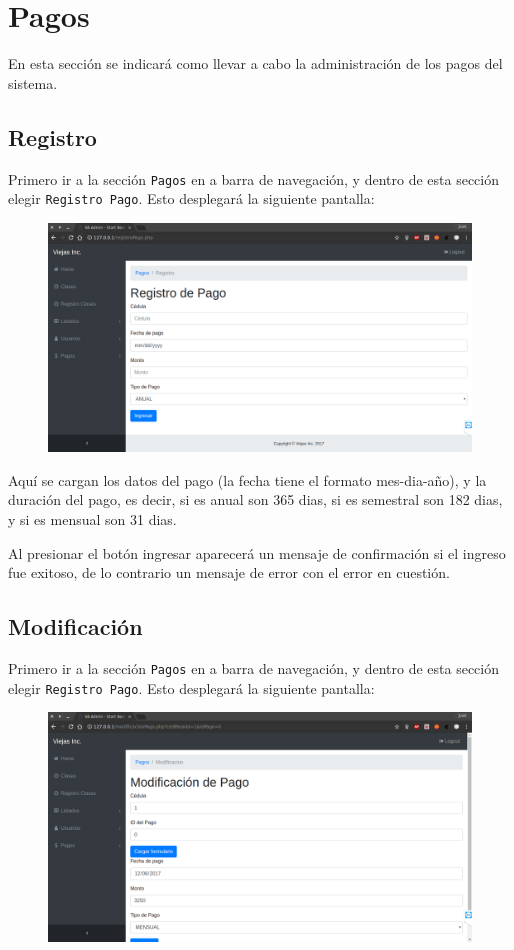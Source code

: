 \documentclass[a4paper, 12pt, spanish]{report}
\begin{document}
\newpage
\section{Pagos}
En esta sección se indicará como llevar a cabo la administración de los pagos del sistema.
\subsection{Registro}
\par Primero ir a la sección \verb|Pagos| en a barra de navegación, y dentro de esta sección elegir \verb|Registro Pago|. Esto desplegará la siguiente pantalla:
\begin{figure}[H]
	\centering
	\includegraphics[width=\linewidth]{imagenes/pa_reg}
	\label{fig:pareg}
\end{figure}

\par Aquí se cargan los datos del pago (la fecha tiene el formato mes-dia-año), y la duración del pago, es decir, si es anual son 365 dias, si es semestral son 182 dias, y si es mensual son 31 dias.
\par Al presionar el botón ingresar aparecerá un mensaje de confirmación si el ingreso fue exitoso, de lo contrario un mensaje de error con el error en cuestión.

\subsection{Modificación}
\par Primero ir a la sección \verb|Pagos| en a barra de navegación, y dentro de esta sección elegir \verb|Registro Pago|. Esto desplegará la siguiente pantalla:
\begin{figure}[H]
	\centering
	\includegraphics[width=\linewidth]{imagenes/pa_mod_car}
	\label{fig:pamodcar}
\end{figure}
\end{document}
